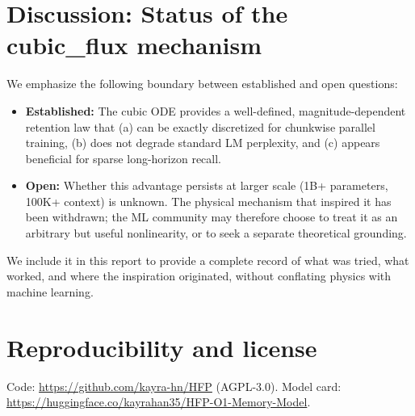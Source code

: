 \documentclass[11pt,a4paper]{article}
\begin{document}
\section{Discussion: Status of the cubic\_flux mechanism}

We emphasize the following boundary between established and open questions:

\begin{itemize}
\item \textbf{Established:} The cubic ODE provides a well-defined, magnitude-dependent retention law that (a) can be exactly discretized for chunkwise parallel training, (b) does not degrade standard LM perplexity, and (c) appears beneficial for sparse long-horizon recall.
\item \textbf{Open:} Whether this advantage persists at larger scale (1B+ parameters, 100K+ context) is unknown. The physical mechanism that inspired it has been withdrawn; the ML community may therefore choose to treat it as an arbitrary but useful nonlinearity, or to seek a separate theoretical grounding.
\end{itemize}

\noindent
We include it in this report to provide a complete record of what was tried, what worked, and where the inspiration originated, without conflating physics with machine learning.

\section*{Reproducibility and license}
Code: \url{https://github.com/kayra-hn/HFP} (AGPL-3.0). Model card:
\url{https://huggingface.co/kayrahan35/HFP-O1-Memory-Model}.
\end{document}
